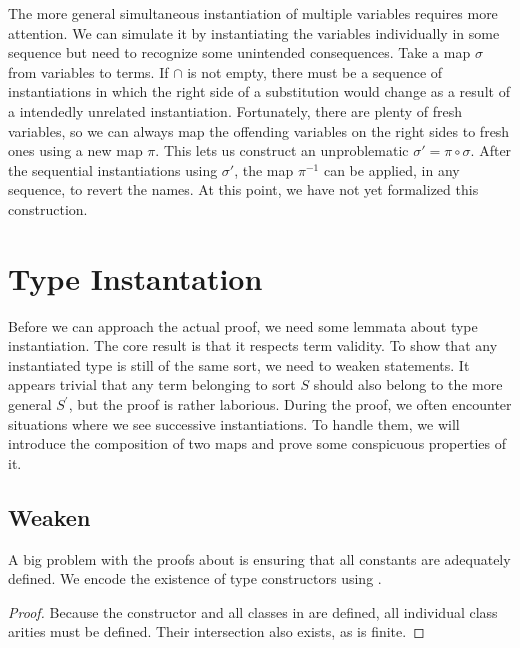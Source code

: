 The more general simultaneous instantiation of multiple variables requires more attention.
We can simulate it by instantiating the variables individually in some sequence but need to recognize some unintended consequences.
Take a map \(\sigma\) from variables to terms.
If  \(\cap\)  is not empty, there must be a sequence of instantiations in which the right side of a substitution would change as a result of a intendedly unrelated instantiation.
Fortunately, there are plenty of fresh variables, so we can always map the offending variables on the right sides to fresh ones using a new map \(\pi\).
This lets us construct an unproblematic \(\sigma' = \pi \circ \sigma\).
After the sequential instantiations using \(\sigma'\), the map \(\pi^{-1}\) can be applied, in any sequence, to revert the names.
At this point, we have not yet formalized this construction.

\section{Type Instantation}

Before we can approach the actual proof, we need some lemmata about type instantiation.
The core result is that it respects term validity.
To show that any instantiated type is still of the same sort, we need to weaken  statements.
It appears trivial that any term belonging to sort \(S\) should also belong to the more general \(S^\prime\), but the proof is rather laborious.
During the proof, we often encounter situations where we see successive instantiations.
To handle them, we will introduce the composition of two maps and prove some conspicuous properties of it.

\subsection{Weaken }

A big problem with the proofs about  is ensuring that all constants are adequately defined.
We encode the existence of type constructors using .

\begin{lemma}
\end{lemma}
\begin{proof}
    Because the constructor and all classes in  are defined, all individual class arities must be defined.
    Their intersection also exists, as  is finite.
\end{proof}

